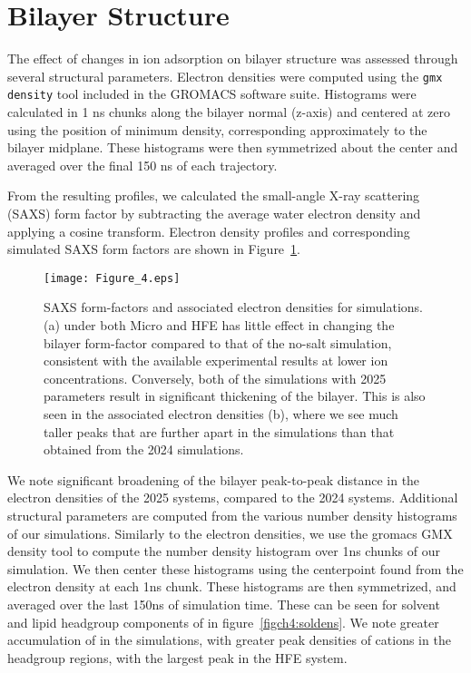 \section{Bilayer Structure}
The effect of changes in ion adsorption on bilayer structure was assessed through several structural parameters. Electron densities were
computed using the \texttt{gmx density} tool included in the GROMACS software suite. Histograms were calculated in 1 ns chunks along the
bilayer normal (z-axis) and centered at zero using the position of minimum density, corresponding approximately to the bilayer midplane.
These histograms were then symmetrized about the center and averaged over the final 150 ns of each trajectory.

From the resulting profiles, we calculated the small-angle X-ray scattering (SAXS) form factor by subtracting the average water electron
density and applying a cosine transform. Electron density profiles and corresponding simulated SAXS form factors are shown in
Figure~\ref{figch4:formfactors}.

\begin{figure}[H]
    \caption[SAXS formfactors]{SAXS form-factors and associated electron densities for \mg{} simulations. (a)  under both Micro
and HFE has little effect in changing the bilayer form-factor compared to that of the no-salt simulation, consistent with the available experimental results at lower ion concentrations. 
Conversely, both of the simulations with 2025 parameters result in significant thickening of the bilayer. 
This is also seen in the associated electron densities (b), where we see much taller peaks that are further apart in the  simulations
than that obtained from the 2024 simulations.}
    \label{figch4:formfactors}
    \texttt{[image: Figure\_4.eps]}
\end{figure}
We note significant broadening of the bilayer peak-to-peak distance in the electron densities of the 2025 systems, compared to the 2024 systems. 
Additional structural parameters are computed from the various number density histograms of our simulations. Similarly to the electron densities, we use the gromacs GMX density tool to compute the number density histogram over 1ns chunks of our simulation. We then center these histograms using the centerpoint found from the electron
density at each 1ns chunk. 
These histograms are then symmetrized, and averaged over the last 150ns of simulation time. 
These can be seen for solvent and lipid headgroup components of in figure~\ref{figch4:soldens}.
We note greater accumulation of \mg{} in the  simulations, with greater peak densities of cations in the headgroup regions, with the largest peak in the  HFE system. 

